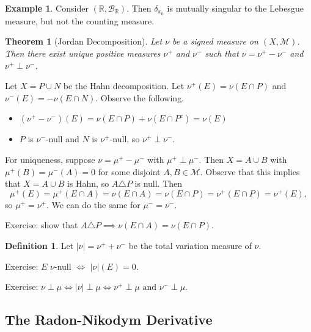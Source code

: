 \documentclass[11pt]{article}
\newtheorem{thm}{Theorem}[section]
\theoremstyle{definition}
\newtheorem{defn}{Definition}[section]
\newtheorem{example}{Example}[section]
\newcommand{\abs}[1]{\left\lvert#1\right\rvert} %
\newcommand{\RR}{\mathbb{R}}
\newcommand{\m}[1]{\mathcal{#1}}
\begin{document}
\begin{example}
  Consider $(\RR,\m{B}_\RR)$. Then $\delta_{x_0}$ is mutually singular to the Lebesgue
  measure, but not the counting measure. 
\end{example}

\begin{thm}[Jordan Decomposition]
  Let $\nu$ be a signed measure on $(X,\m{M})$. Then there exist unique positive measures
  $\nu^+$ and $\nu^-$ such that $\nu=\nu^+-\nu^-$ and $\nu^+\perp\nu^-$. 
\end{thm}
\proof
Let $X=P\cup N$ be the Hahn decomposition. Let $\nu^+(E)=\nu(E\cap P)$ and
$\nu^-(E)=-\nu(E\cap N)$. Observe the following. 
\begin{itemize}
  \item $(\nu^+-\nu^-)(E)=\nu(E\cap P)+\nu(E\cap P^c)=\nu(E)$ 
  \item $P$ is $\nu^-$-null and $N$ is $\nu^+$-null, so $\nu^+\perp\nu^-$. 
\end{itemize}
For uniqueness, suppose $\nu=\mu^+-\mu^-$ with $\mu^+\perp\mu^-$. Then $X=A\cup B$ with
$\mu^+(B)=\mu^-(A)=0$ for some disjoint $A,B\in\m{M}$. Observe that this implies that
$X=A\cup B$ is Hahn, so $A\triangle P$ is null. Then 
\[
  \mu^+(E)=\mu^+(E\cap A)=\nu(E\cap A)=\nu(E\cap P)=\nu^+(E\cap P)=\nu^+(E) ,
\]
so $\mu^+=\nu^+$. We can do the same for $\mu^-=\nu^-$. 

{\color{red}Exercise: show that $A\triangle P \implies \nu(E\cap A)=\nu(E\cap P)$.}
\qedhere

\begin{defn}
  Let $\abs{\nu}=\nu^++\nu^-$ be the total variation measure of $\nu$.  \end{defn}

{\color{red}
Exercise: $E$ $\nu$-null $\iff$ $\abs{\nu}(E)=0$. 

Exercise: $\nu\perp\mu \iff \abs{\nu}\perp\mu \iff \nu^+\perp\mu \text{ and }
\nu^-\perp\mu$. 
}

\subsection{The Radon-Nikodym Derivative}
\end{document}

